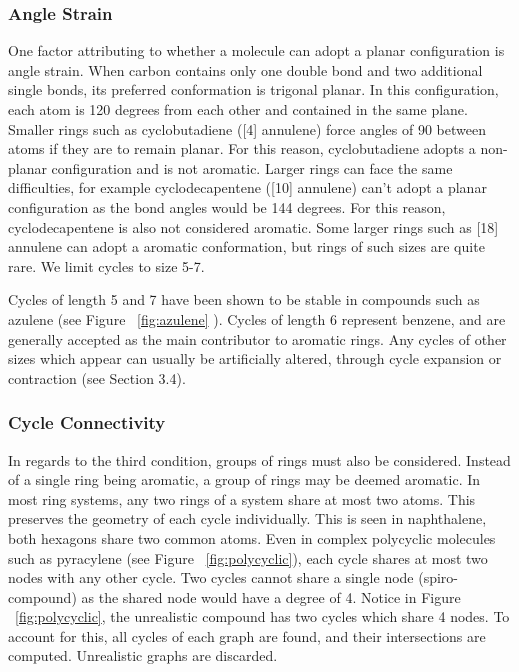 \documentclass[12pt]{article}
\begin{document}
\subsubsection{Angle Strain}

One factor attributing to whether a molecule can adopt a planar configuration is angle strain. When carbon contains only one double bond and two additional single bonds, its preferred conformation is trigonal planar. In this configuration, each atom is 120 degrees from each other and contained in the same plane. Smaller rings such as cyclobutadiene ([4] annulene) force angles of 90 between atoms if they are to remain planar. For this reason, cyclobutadiene adopts a non-planar configuration and is not aromatic. Larger rings can face the same difficulties, for example cyclodecapentene ([10] annulene) can't adopt a planar configuration as the bond angles would be 144 degrees. For this reason, cyclodecapentene is also not considered aromatic. Some larger rings such as [18] annulene can adopt a aromatic conformation, but rings of such sizes are quite rare.  We limit cycles to size 5-7. 

Cycles of length 5 and 7 have been shown to be stable in compounds such as azulene (see Figure ~\ref{fig:azulene} ). Cycles of length 6 represent benzene, and are generally accepted as the main contributor to aromatic rings. Any cycles of other sizes which appear can usually be artificially altered, through cycle expansion or contraction (see Section 3.4).

\subsubsection{Cycle Connectivity}

In regards to the third condition, groups of rings must also be considered. Instead of a single ring being aromatic, a group of rings may be deemed aromatic. In most ring systems, any two rings of a system share at most two atoms. This preserves the geometry of each cycle individually. This is seen in naphthalene, both hexagons share two common atoms. Even in complex polycyclic molecules such as pyracylene (see Figure ~\ref{fig:polycyclic}), each cycle shares at most two nodes with any other cycle. Two cycles cannot share a single node (spiro-compound) as the shared node would have a degree of 4. Notice in Figure ~\ref{fig:polycyclic}, the unrealistic compound has two cycles which share 4 nodes. To account for this, all cycles of each graph are found, and their intersections are computed. Unrealistic graphs are discarded.
\end{document}
